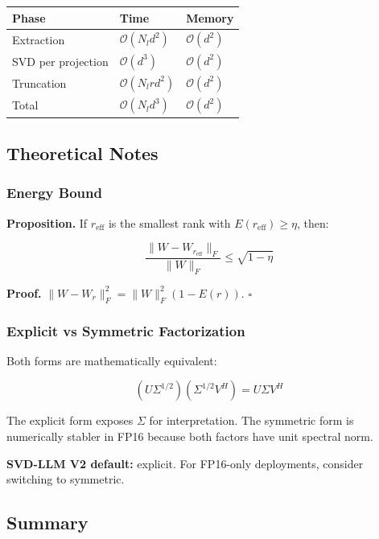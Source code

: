 \begin{table}[H]
\centering
\small
\begin{tabular}{lll}
\toprule
\textbf{Phase} & \textbf{Time} & \textbf{Memory} \\
\midrule
Extraction & $\mathcal{O}(N_l d^2)$ & $\mathcal{O}(d^2)$ \\
SVD per projection & $\mathcal{O}(d^3)$ & $\mathcal{O}(d^2)$ \\
Truncation & $\mathcal{O}(N_l r d^2)$ & $\mathcal{O}(d^2)$ \\
Total & $\mathcal{O}(N_l d^3)$ & $\mathcal{O}(d^2)$ \\
\bottomrule
\end{tabular}
\end{table}

\subsection{Theoretical Notes}

\subsubsection{Energy Bound}

\textbf{Proposition.} If $r_\text{eff}$ is the smallest rank with 
$E(r_\text{eff}) \geq \eta$, then:

\[
\frac{\|W - W_{r_\text{eff}}\|_F}{\|W\|_F} \leq \sqrt{1 - \eta}
\tag{4.3}
\]

\textbf{Proof.} $\|W - W_r\|_F^2 = \|W\|_F^2 (1 - E(r))$. $\square$

\subsubsection{Explicit vs Symmetric Factorization}

Both forms are mathematically equivalent:

\[
(U \Sigma^{1/2}) (\Sigma^{1/2} V^H) = U \Sigma V^H
\tag{4.4}
\]

The explicit form exposes $\Sigma$ for interpretation. The symmetric form is 
numerically stabler in FP16 because both factors have unit spectral norm.

\textbf{SVD-LLM V2 default:} explicit. For FP16-only deployments, consider 
switching to symmetric.

\subsection{Summary}


